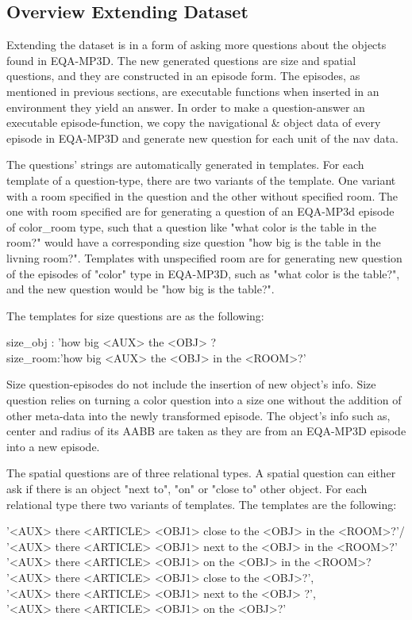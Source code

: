 \subsection{ Overview Extending Dataset}

Extending the dataset is in a form of asking more questions about the objects found in EQA-MP3D. The new generated questions are size and spatial questions, and they are constructed in an episode form. The episodes, as mentioned in previous sections, are executable functions when inserted in an environment they yield an answer. In order to make a question-answer an executable episode-function, we copy the navigational \& object data of every episode in EQA-MP3D and generate new question for each unit of the nav data.


The questions' strings are automatically generated in templates. For each template of a question-type, there are two variants of the template. One variant with a room specified in the question and the other without specified room. The one with room specified are for generating a question of an EQA-MP3d episode of color\_room type, such that a question like "what color is the table in the room?" would have a corresponding size question "how big is the table in the livning room?". Templates with unspecified room are for generating new question of the episodes of "color" type in EQA-MP3D, such as "what color is the table?", and the new question would be "how big is the table?". 

The templates for size questions are as the following: 

size\_obj : 'how big <AUX> the <OBJ> ? \\
size\_room:'how big <AUX>  the <OBJ> in the <ROOM>?'  

Size question-episodes do not include the insertion of new object's info. Size question relies on turning a color question into a size one without the addition of other meta-data into the newly transformed episode. The object's info such as, center and radius of its AABB are taken as they are from an EQA-MP3D episode into a new episode. 

The spatial questions are of three relational types. A spatial question can either ask if there is an object "next to", "on" or "close to" other object. For each relational type there two variants of templates. The templates are the following: 

 '<AUX> there <ARTICLE> <OBJ1> close to the <OBJ> in the <ROOM>?'/\\
'<AUX> there <ARTICLE>  <OBJ1> next to the <OBJ> in the <ROOM>?' \\
'<AUX>  there <ARTICLE> <OBJ1> on the <OBJ> in the <ROOM>?\\
'<AUX> there <ARTICLE> <OBJ1> close to the <OBJ>?',\\
'<AUX>  there <ARTICLE> <OBJ1> next to the <OBJ> ?',\\
'<AUX>  there <ARTICLE> <OBJ1> on the <OBJ>?'

